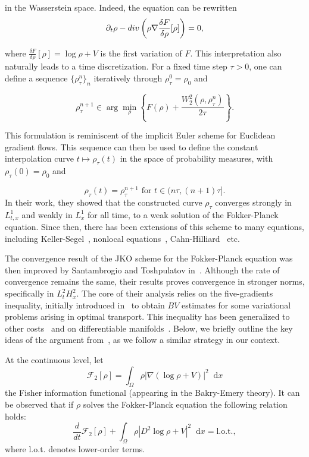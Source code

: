 \documentclass[a4paper,twosided, 11pt]{article}
\newcommand {\Div}  { {\rm div} }
\newcommand {\f}   {\frac}
\newcommand {\p}   {\partial}
\theoremstyle{plain}
\theoremstyle{remark}
\newcommand{\diff}{\mathop{}\!\mathrm{d}}
\numberwithin{equation}{section}
\begin{document}
in the Wasserstein space. Indeed, the equation can be rewritten 
$$
\p_t \rho - \Div\left(\rho \nabla \f{\delta F}{\delta \rho}[\rho]\right)=0, 
$$

where $\f{\delta F}{\delta \rho}[\rho]=\log \rho + V$ is the first variation of $F$.  This interpretation also naturally leads to a time discretization.  For a fixed time step \(\tau > 0\), one can define a sequence $\{\rho_\tau^n\}_{n}$ iteratively through $\rho_{\tau}^{0}= \rho_{0}$ and

\[
\rho_\tau^{n+1} \in \arg\min_{\rho} \left\{ F(\rho) + \frac{W_2^2(\rho, \rho_\tau^n)}{2\tau} \right\}.
\]

This formulation is reminiscent of the implicit Euler scheme for Euclidean gradient flows. This sequence can then be used to define the constant interpolation curve \( t \mapsto \rho_\tau(t) \) in the space of probability measures, with \(\rho_\tau(0) = \rho_0\) and 

\[
\rho_\tau(t) = \rho_\tau^{n+1} \text{ for } t \in (n\tau, (n+1)\tau].
\]
In their work, they showed that the constructed curve $\rho_{\tau}$ converges strongly in $L^{1}_{t,x}$ and weakly in $L^{1}_{x}$ for all time, to a weak solution of the Fokker-Planck equation. Since then, there has been extensions of this scheme to many equations, including  Keller-Segel~\cite{carrillo2018,blanchet2013gradient,blanchet2008convergence, dimarino,kim2023density}, nonlocal equations~\cite{burger2023porous,carrillo2024nonlocal,di2018nonlinear}, Cahn-Hilliard~\cite{antonio2024competing,lisini2012cahn,kroemer2022hele,carrillo2023degenerate} etc.  

The convergence result of the JKO scheme for the Fokker-Planck equation was then improved by Santambrogio and Toshpulatov in~\cite{toshpulatov}. Although the rate of convergence remains the same, their results proves convergence in stronger norms, specifically in $L^{2}_{t}H^{2}_{x}$. The core of their analysis relies on the five-gradients inequality, initially introduced in~\cite{de2016bv} to obtain $BV$ estimates for some variational problems arising in optimal transport. This inequality has been generalized to other costs~\cite{CRMATH_2023__361_G3_715_0} and on differentiable manifolds~\cite{DIMARINO2024294}. Below, we briefly outline the key ideas of the argument from~\cite{toshpulatov}, as we follow a similar strategy in our context.

At the continuous level, let 
\[
\mathcal{F}_{2}[\rho] = \int_{\Omega} \rho|\nabla (\log \rho + V)|^2 \diff x
\]
the Fisher information functional (appearing in the Bakry-Emery theory).
It can be observed that if $\rho$ solves the Fokker-Planck equation the following relation holds:
\[
\frac{d}{dt} \mathcal{F}_{2}[\rho] + \int_{\Omega} \rho |D^{2}\log\rho+V|^2 \diff x= \text{l.o.t.},
\]
where l.o.t. denotes lower-order terms.
\end{document}
